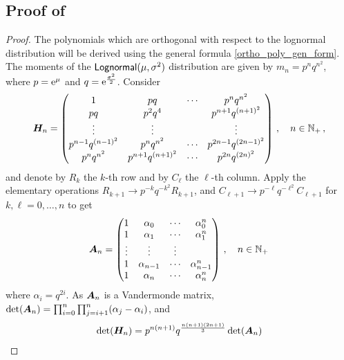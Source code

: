 \begin{subappendices}
\section{Proof of } \label{app:lognormal_poly}
\begin{proof}
The polynomials which are orthogonal with respect to the lognormal distribution will be derived using the general formula \eqref{ortho_poly_gen_form}.
The moments of the $\mathsf{Lognormal}(\mu, \sigma^2)$ distribution are given by $m_{n}=p^{n}q^{n^{2}}$, where $p=\mathrm{e}^{\mu}$ and $q=\mathrm{e}^{\frac{\sigma^{2}}{2}}$. Consider
\begin{equation}\label{eq:Dn1}
\bm{H}_n=\begin{pmatrix}
1&pq&\cdots&p^{n}q^{n^{2}} \\
pq&p^{2}q^{4}&&p^{n+1}q^{(n+1)^{2}}\\
\vdots&\vdots&&\vdots\\
p^{n-1}q^{(n-1)^{2}}&p^{n}q^{n^{2}}&\cdots&p^{2n-1}q^{(2n-1)^{2}}\\
p^{n}q^{n^{2}}&p^{n+1}q^{(n+1)^{2}}&\cdots&p^{2n}q^{(2n)^{2}}
\end{pmatrix}
\,, \quad n \in \mathbb{N}_+\,,
\end{equation}
and denote by $R_{k}$ the $k$-th row and by $C_{\ell}$ the $\ell$-th column. Apply the elementary operations $R_{k+1}\rightarrow p^{-k}q^{-k^{2}}R_{k+1}$, and $C_{\ell+1}\rightarrow p^{-\ell}q^{-\ell^{2}}C_{\ell+1}$ for $k,\ell=0,\ldots,n$ to get
\begin{equation} \label{vand}
\bm{A}_n = \begin{pmatrix}
1 & \alpha_0 & \cdots & \alpha_0^n \\
1 & \alpha_1 & \cdots & \alpha_1^n \\
\vdots&\vdots&\vdots\\
1 & \alpha_{n-1} & \cdots & \alpha_{n-1}^n\\
1 & \alpha_n     & \cdots & \alpha_n^n
\end{pmatrix}
\,, \quad n \in \mathbb{N}_+\,
\end{equation}
where $\alpha_i=q^{2i}$. As $\bm{A}_n$ is a Vandermonde matrix, $\det(\bm{A}_n) = \prod_{i=0}^{n} \prod_{j=i+1}^{n} (\alpha_j - \alpha_i)$, and
\begin{align}
\det(\bfH_n)
&= p^{n(n+1)} q^{\frac{n(n+1)(2n+1)}{3}} \det(\bfA_n) \label{detA_detH} \\

\end{align}
\end{proof}
\end{subappendices}
